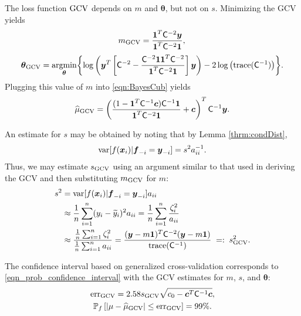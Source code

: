 \documentclass{iitthesis}          %
\newcommand{\bm}[1]{\boldsymbol{#1}}
\newcommand{\trace}[1]{\textup{trace}{#1}}
\newcommand{\vtheta}{{\bm{\theta}}}
\newcommand{\vc}{\bm{c}}
\newcommand{\vf}{\bm{f}}
\newcommand{\vx}{\bm{x}}
\newcommand{\vy}{\bm{y}}
\newcommand{\vone}{\bm{1}}
\newcommand{\mC}{\mathsf{C}}
\newcommand{\var}{{\textup{var}}}
\newcommand{\hmu}{\widehat{\mu}}
\newcommand{\GCV}{\textup{GCV}}
\newcommand{\err}{\textup{err}}
\providecommand{\argmin}{\operatorname*{argmin}}
\begin{document}
The loss function $\textup{GCV}$ depends on $m$ and $\vtheta$, but not on $s$.  Minimizing the GCV  yields
\begin{equation*}
m_{\textup{GCV}} = \frac{\vone^T \mC^{-2} \vy}{\vone^T \mC^{-2} \vone},\\ 
\end{equation*}
\begin{align*}
\vtheta_{\textup{GCV}} = \argmin_\vtheta \biggl\{\log \left(  \vy^T \left[\mC^{-2} - \frac{\mC^{-2} \vone \vone^T \mC^{-2}}{\vone^T \mC^{-2} \vone}  \right] \vy \right)  
- 2 \log \left ( \trace(\mC^{-1}) \right ) \biggr\} .
\end{align*}
Plugging this value of $m$ into \eqref{eqn:BayesCub} yields
\begin{equation*}
\widehat{\mu}_{\textup{GCV}}
= \left(\frac{(1 - \vone^T  \mC^{-1}\vc) \mC^{-1} \vone}{\vone^T \mC^{-2} \vone} + \vc \right)^T \mC^{-1} \vy.
\end{equation*}

An estimate for $s$ may be obtained by noting that by Lemma \ref{thrm:condDist},
\begin{align*}
\var[f(\vx_i ) | \vf_{-i} = \vy_{-i}] = s^2 a_{ii}^{-1}.
\end{align*}
Thus, we may estimate $s_\GCV$ using an argument similar to that used in deriving the GCV and then substituting $m_{\textup{GCV}}$ for $m$:
\begin{align*}
s^2 &= \var[f(\vx_i ) | \vf_{-i} = \vy_{-i}] a_{ii} \\ 
& \approx \frac 1n \sum_{i=1}^n (y_i - \widetilde{y}_i)^2a_{ii}  = \frac 1n \sum_{i=1}^n \frac{\zeta_i^2}{a_{ii}} \\ 
& \approx \frac{ \frac 1n \sum_{i=1}^n \zeta_i^2}{\frac 1n \sum_{i=1}^n a_{ii} } 
 = \frac{(\vy - m\vone)^T \mC^{-2} (\vy - m \vone)}{ \trace(\mC^{-1}) } \; =: \; s^2_{\textup{GCV}}. \\
\end{align*}

The confidence interval based on generalized cross-validation corresponds to \eqref{eqn_prob_confidence_interval} with the GCV estimates for $m$, $s$, and $\vtheta$:
\begin{gather}
\label{GCVerr}
\err_{\textup{GCV}} = 2.58 s_{\textup{GCV}}  \sqrt{c_0 - \vc^T\mC^{-1}\vc}, \\
\label{GCVCI}
\mathbb{P}_f \left[
|\mu-\hmu_{\textup{GCV}}| \leq \err_{\textup{GCV}} 
\right] = 99\%.
\end{gather}
\end{document}
